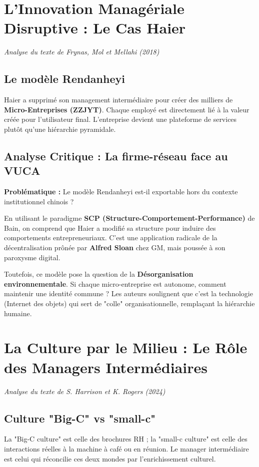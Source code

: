 \documentclass[12pt,a4paper]{report}
\begin{document}
\newpage

\section{L'Innovation Managériale Disruptive : Le Cas Haier}
\textit{Analyse du texte de Frynas, Mol et Mellahi (2018)}

\subsection{Le modèle Rendanheyi}
Haier a supprimé son management intermédiaire pour créer des milliers de \textbf{Micro-Entreprises (ZZJYT)}. Chaque employé est directement lié à la valeur créée pour l'utilisateur final. L'entreprise devient une plateforme de services plutôt qu'une hiérarchie pyramidale.

\subsection{Analyse Critique : La firme-réseau face au VUCA}
\textbf{Problématique :} Le modèle Rendanheyi est-il exportable hors du contexte institutionnel chinois ?

En utilisant le paradigme \textbf{SCP (Structure-Comportement-Performance)} de Bain, on comprend que Haier a modifié sa structure pour induire des comportements entrepreneuriaux. C'est une application radicale de la décentralisation prônée par \textbf{Alfred Sloan} chez GM, mais poussée à son paroxysme digital. 

Toutefois, ce modèle pose la question de la \textbf{Désorganisation environnementale}. Si chaque micro-entreprise est autonome, comment maintenir une identité commune ? Les auteurs soulignent que c'est la technologie (Internet des objets) qui sert de "colle" organisationnelle, remplaçant la hiérarchie humaine.


\section{La Culture par le Milieu : Le Rôle des Managers Intermédiaires}
\textit{Analyse du texte de S. Harrison et K. Rogers (2024)}

\subsection{Culture "Big-C" vs "small-c"}
La "Big-C culture" est celle des brochures RH ; la "small-c culture" est celle des interactions réelles à la machine à café ou en réunion. Le manager intermédiaire est celui qui réconcilie ces deux mondes par l'enrichissement culturel.
\end{document}
